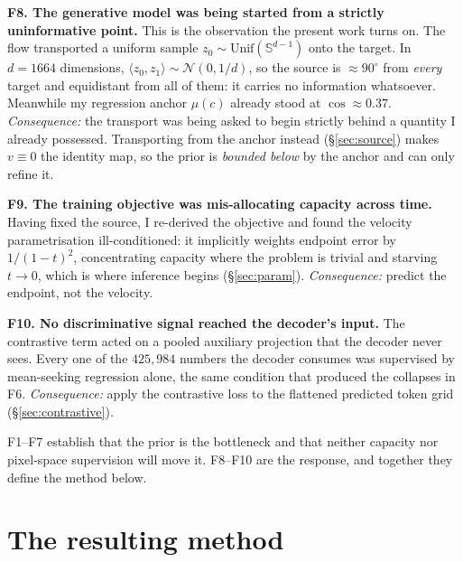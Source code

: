 \documentclass[11pt,a4paper]{article}
\newcommand{\Sph}[1]{\mathbb{S}^{#1}}
\newcommand{\Unif}{\mathrm{Unif}}
\theoremstyle{plain}
\theoremstyle{remark}
\newenvironment{finding}[1]%
  {\medskip\noindent\textbf{#1}\quad}%
  {\medskip}
\begin{document}
\begin{finding}{F8. The generative model was being started from a strictly uninformative point.}
This is the observation the present work turns on. The flow transported a
uniform sample $z_0\sim\Unif(\Sph{d-1})$ onto the target. In $d=1664$
dimensions, $\langle z_0,z_1\rangle \sim \mathcal{N}(0, 1/d)$, so the source is
$\approx\!90^\circ$ from \emph{every} target and equidistant from all of them:
it carries no information whatsoever. Meanwhile my regression anchor $\mu(c)$
already stood at $\cos\approx0.37$.
\emph{Consequence:} the transport was being asked to begin strictly behind a
quantity I already possessed. Transporting from the anchor instead
(\S\ref{sec:source}) makes $v\equiv0$ the identity map, so the prior is
\emph{bounded below} by the anchor and can only refine it.
\end{finding}

\begin{finding}{F9. The training objective was mis-allocating capacity across time.}
Having fixed the source, I re-derived the objective and found the velocity
parametrisation ill-conditioned: it implicitly weights endpoint error by
$1/(1-t)^2$, concentrating capacity where the problem is trivial and starving
$t\!\to\!0$, which is where inference begins (\S\ref{sec:param}).
\emph{Consequence:} predict the endpoint, not the velocity.
\end{finding}

\begin{finding}{F10. No discriminative signal reached the decoder's input.}
The contrastive term acted on a pooled auxiliary projection that the decoder
never sees. Every one of the $425{,}984$ numbers the decoder consumes was
supervised by mean-seeking regression alone, the same condition that produced
the collapses in F6.
\emph{Consequence:} apply the contrastive loss to the flattened predicted token
grid (\S\ref{sec:contrastive}).
\end{finding}

\noindent
F1--F7 establish that the prior is the bottleneck and that neither capacity nor
pixel-space supervision will move it. F8--F10 are the response, and together
they define the method below.

\section{The resulting method}
\label{sec:method}
\end{document}
